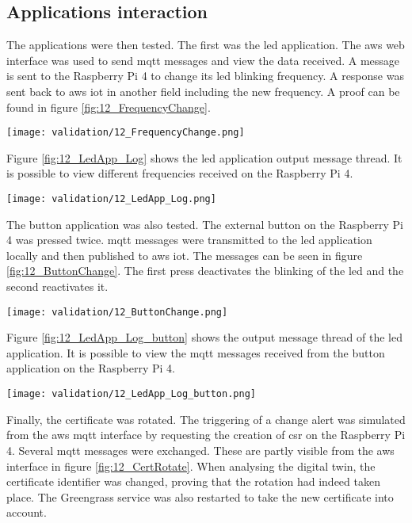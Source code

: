 \subsection{Applications interaction}
The applications were then tested. The first was the led application. The \gls{aws} web interface was used to send \acrshort{mqtt} messages and view the data received. A message is sent to the Raspberry Pi 4 to change its led blinking frequency. A response was sent back to \gls{aws} \acrshort{iot} in another field including the new frequency. A proof can be found in figure \ref{fig:12_FrequencyChange}.
\begin{center}
    \begingroup
    \texttt{[image: validation/12\_FrequencyChange.png]}
    \label{fig:12_FrequencyChange}
    \endgroup
\end{center}
Figure \ref{fig:12_LedApp_Log} shows the led application output message thread. It is possible to view different frequencies received on the Raspberry Pi 4.
\begin{center}
    \begingroup
    \texttt{[image: validation/12\_LedApp\_Log.png]}
    \label{fig:12_LedApp_Log}
    \endgroup
\end{center}
The button application was also tested. The external button on the Raspberry Pi 4 was pressed twice. \acrshort{mqtt} messages were transmitted to the led application locally and then published to \gls{aws} \acrshort{iot}. The messages can be seen in figure \ref{fig:12_ButtonChange}. The first press deactivates the blinking of the led and the second reactivates it.
\begin{center}
    \begingroup
    \texttt{[image: validation/12\_ButtonChange.png]}
    \label{fig:12_ButtonChange}
    \endgroup
\end{center}
Figure \ref{fig:12_LedApp_Log_button} shows the output message thread of the led application. It is possible to view the \acrshort{mqtt} messages received from the button application on the Raspberry Pi 4.
\begin{center}
    \begingroup
    \texttt{[image: validation/12\_LedApp\_Log\_button.png]}
    \label{fig:12_LedApp_Log_button}
    \endgroup
\end{center}
Finally, the certificate was rotated. The triggering of a change alert was simulated from the \gls{aws} \acrshort{mqtt} interface by requesting the creation of \acrshort{csr} on the Raspberry Pi 4. Several \acrshort{mqtt} messages were exchanged. These are partly visible from the \gls{aws} interface in figure \ref{fig:12_CertRotate}. When analysing the digital twin, the certificate identifier was changed, proving that the rotation had indeed taken place. The Greengrass service was also restarted to take the new certificate into account.
